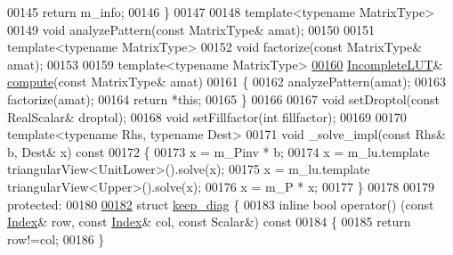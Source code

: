 \begin{DoxyCode}
00145       \textcolor{keywordflow}{return} m\_info;
00146     \}
00147     
00148     \textcolor{keyword}{template}<\textcolor{keyword}{typename} MatrixType>
00149     \textcolor{keywordtype}{void} analyzePattern(\textcolor{keyword}{const} MatrixType& amat);
00150     
00151     \textcolor{keyword}{template}<\textcolor{keyword}{typename} MatrixType>
00152     \textcolor{keywordtype}{void} factorize(\textcolor{keyword}{const} MatrixType& amat);
00153     
00159     \textcolor{keyword}{template}<\textcolor{keyword}{typename} MatrixType>
\hyperlink{group___iterative_linear_solvers___module_a488e37ab51d8ed37a297eeca521f1817}{00160}     \hyperlink{group___iterative_linear_solvers___module_class_eigen_1_1_incomplete_l_u_t}{IncompleteLUT}& \hyperlink{group___iterative_linear_solvers___module_a488e37ab51d8ed37a297eeca521f1817}{compute}(\textcolor{keyword}{const} MatrixType& amat)
00161     \{
00162       analyzePattern(amat); 
00163       factorize(amat);
00164       \textcolor{keywordflow}{return} *\textcolor{keyword}{this};
00165     \}
00166 
00167     \textcolor{keywordtype}{void} setDroptol(\textcolor{keyword}{const} RealScalar& droptol); 
00168     \textcolor{keywordtype}{void} setFillfactor(\textcolor{keywordtype}{int} fillfactor); 
00169     
00170     \textcolor{keyword}{template}<\textcolor{keyword}{typename} Rhs, \textcolor{keyword}{typename} Dest>
00171     \textcolor{keywordtype}{void} \_solve\_impl(\textcolor{keyword}{const} Rhs& b, Dest& x)\textcolor{keyword}{ const}
00172 \textcolor{keyword}{    }\{
00173       x = m\_Pinv * b;
00174       x = m\_lu.template triangularView<UnitLower>().solve(x);
00175       x = m\_lu.template triangularView<Upper>().solve(x);
00176       x = m\_P * x; 
00177     \}
00178 
00179 \textcolor{keyword}{protected}:
00180 
\hyperlink{struct_eigen_1_1_incomplete_l_u_t_1_1keep__diag}{00182}     \textcolor{keyword}{struct }\hyperlink{struct_eigen_1_1_incomplete_l_u_t_1_1keep__diag}{keep\_diag} \{
00183       \textcolor{keyword}{inline} \textcolor{keywordtype}{bool} operator() (\textcolor{keyword}{const} \hyperlink{namespace_eigen_a62e77e0933482dafde8fe197d9a2cfde}{Index}& row, \textcolor{keyword}{const} \hyperlink{namespace_eigen_a62e77e0933482dafde8fe197d9a2cfde}{Index}& col, \textcolor{keyword}{const} Scalar&)\textcolor{keyword}{ const}
00184 \textcolor{keyword}{      }\{
00185         \textcolor{keywordflow}{return} row!=col;
00186       \}

\end{DoxyCode}
